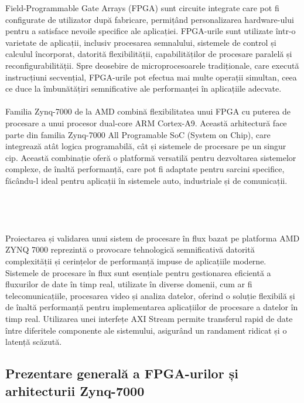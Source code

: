 \documentclass[12pt]{article}
\begin{document}
\hspace*{1cm}Field-Programmable Gate Arrays (FPGA) sunt circuite integrate care pot fi configurate de utilizator după fabricare, permițând personalizarea hardware-ului pentru a satisface nevoile specifice ale aplicației. FPGA-urile sunt utilizate într-o varietate de aplicații, inclusiv procesarea semnalului, sistemele de control și calculul încorporat, datorită flexibilității, capabilităților de procesare paralelă și reconfigurabilității. Spre deosebire de microprocesoarele tradiționale, care execută instrucțiuni secvențial, FPGA-urile pot efectua mai multe operații simultan, ceea ce duce la îmbunătățiri semnificative ale performanței în aplicațiile adecvate.\\\\
\hspace*{1cm}Familia Zynq-7000 de la AMD combină flexibilitatea unui FPGA cu puterea de procesare a unui procesor dual-core ARM Cortex-A9. Această arhitectură face parte din familia Zynq-7000 All Programable SoC (System on Chip), care integrează atât logica programabilă, cât și sistemele de procesare pe un singur cip. Această combinație oferă o platformă versatilă pentru dezvoltarea sistemelor complexe, de înaltă performanță, care pot fi adaptate pentru sarcini specifice, făcându-l ideal pentru aplicații în sistemele auto, industriale și de comunicații.\\\\\\\\\\
\hspace*{1cm}Proiectarea și validarea unui sistem de procesare în flux bazat pe platforma AMD ZYNQ 7000 reprezintă o provocare tehnologică semnificativă datorită complexității și cerințelor de performanță impuse de aplicațiile moderne. Sistemele de procesare în flux sunt esențiale pentru gestionarea eficientă a fluxurilor de date în timp real, utilizate în diverse domenii, cum ar fi telecomunicațiile, procesarea video și analiza datelor, oferind o soluție flexibilă și de înaltă performanță pentru implementarea aplicațiilor de procesare a datelor în timp real. Utilizarea unei interfețe AXI Stream permite transferul rapid de date între diferitele componente ale sistemului, asigurând un randament ridicat și o latență scăzută.

\subsection{Prezentare generală a FPGA-urilor și arhitecturii Zynq-7000}
\end{document}
